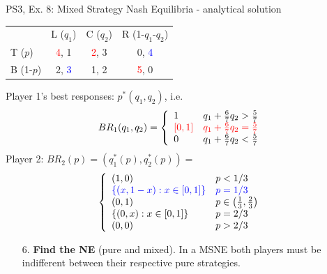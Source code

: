 \begin{frame}{PS3, Ex. 8: Mixed Strategy Nash Equilibria - analytical solution}
  \begin{multicols}{2}
    \begin{table}
      \begin{tabular}{l|c|c|c|}
          \multicolumn{1}{c}{}  & \multicolumn{1}{c}{L ($q_1$)} & \multicolumn{1}{c}{C ($q_2$)} & \multicolumn{1}{c}{R (1-$q_1$-$q_2$)} \\\cline{2-4}
          T ($p$)   & \textcolor{red}{4}, 1 & \textcolor{red}{2}, 3 & 0, \textcolor{blue}{4} \\\cline{2-4}
          B (1-$p$) & 2, \textcolor{blue}{3} & 1, 2 & \textcolor{red}{5}, 0 \\\cline{2-4}
      \end{tabular}
    \end{table}
    Player 1's best responses: $p^{*}(q_1,q_2)$, i.e.
    \begin{align*}
      BR_1(q_1,q_2)=
      \left\{ \begin{array}{ll}
          1                 & q_1 + \frac{6}{7}q_2 > \frac{5}{7}\\
          \textcolor{red}{\left[0,1\right]}  & \textcolor{red}{q_1 + \frac{6}{7}q_2 = \frac{5}{7}}\\
          0                 & q_1 + \frac{6}{7}q_2 < \frac{5}{7}
      \end{array}\right.
    \end{align*}
    Player 2: $BR_2(p)=\left(q_1^{*}(p),q_2^{*}(p)\right)=$
    \begin{align*}
      \left\{ \begin{array}{ll}
          (1,0)                 & p < 1/3 \\
          \textcolor{blue}{\{(x,1-x):x\in[0,1]\}} & \textcolor{blue}{p = 1/3} \\
          (0,1)                 & p\in\left(\frac{1}{3},\frac{2}{3}\right)\\
          \{(0,x):x\in[0,1]\}   & p = 2/3 \\
          (0,0)                 & p > 2/3
      \end{array}\right.
    \end{align*}
  \vfill\null \columnbreak
    \begin{itemize}
      \item[6.] \textbf{Find the NE} (pure and mixed). In a MSNE both players must be indifferent between their respective pure strategies.
    \end{itemize}

\end{multicols}
\end{frame}
